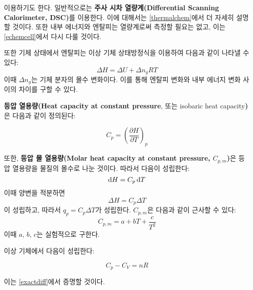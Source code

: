             이용하기도 한다. 일반적으로는 \textbf{주사 시차 열량계(Differential Scanning Calorimeter, DSC)}를 이용한다. 이에 대해서는 \ref{thermalchem}에서 더 자세히 설명할 것이다. 또한 
            내부 에너지와 엔탈피는 열량계로써 측정할 필요는 없고, 이는 \ref{echemcell}에서 다시 다룰 것이다.
            \par 또한 기체 상태에서 엔탈피는 이상 기체 상태방정식을 이용하여 다음과 같이 나타낼 수 있다:
                \begin{equation*}
                    \Delta H = \Delta U + \Delta n_g RT
                \end{equation*}
            이때 $\Delta n_g$는 기체 분자의 몰수 변화이다. 이를 통해 엔탈피 변화와 내부 에너지 변화 사이의 차이를 구할 수 있다.
            \par \textbf{등압 열용량(Heat capacity at constant pressure}, 또는 isobaric heat capacity\textbf{)}은 다음과 같이 정의된다:
            \begin{defn}[등압 열용량]
                \begin{equation*}
                    C_p = \left(\frac{\partial H}{\partial T}\right)_p
                \end{equation*}
            \end{defn}
            또한, \textbf{등압 몰 열용량(Molar heat capacity at constant pressure, $C_{p,m}$)}은 등압 열용량을 물질의 몰수로 나눈 것이다. 따라서 다음이 성립한다:
                \begin{equation*}
                    \operatorname{d\!} H = C_p \operatorname{d\!} T
                \end{equation*}
            이때 양변을 적분하면
                \begin{equation*}
                    \Delta H = C_p \Delta T
                \end{equation*}
            이 성립하고, 따라서 $q_p = C_p \Delta T$가 성립한다. $C_{p,m}$은 다음과 같이 근사할 수 있다:
                \begin{equation*}
                    C_{p,m} = a + bT + \frac{c}{T^2}
                \end{equation*}
            이때 $a$, $b$, $c$는 실험적으로 구한다.
            \par 이상 기체에서 다음이 성립한다:
            \begin{obs}
                \begin{equation*}
                    C_p - C_V = nR
                \end{equation*}
            \end{obs}
            이는 \ref{exactdiff}에서 증명할 것이다.
